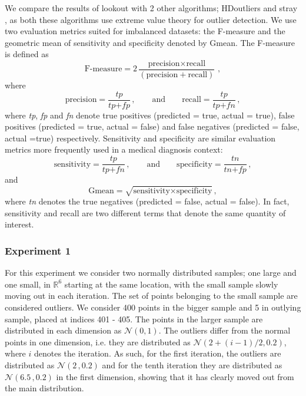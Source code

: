 \documentclass[letter,12pt]{article}
\begin{document}
We compare the results of lookout with 2 other algorithms; HDoutliers \citep{wilkinson2017visualizing} and stray \citep{pridiltal}, as both these algorithms use extreme value theory for outlier detection. We use two evaluation metrics suited for imbalanced datasets: the F-measure and the geometric mean of sensitivity and specificity denoted by Gmean. The F-measure is defined as
\begin{equation}\label{eq:fmeasure}
    \text{F-measure} =  2\frac{\text{precision} \times \text{recall}}{\left( \text{precision} + \text{recall} \right) } \, , 
\end{equation}
where 
\begin{equation}\label{eq:pr}
    \text{precision} =  \frac{ \textit{tp} }{\textit{tp} + \textit{fp}} \, ,  \qquad \text{and} \qquad \text{recall} = \frac{\textit{tp}}{\textit{tp} + \textit{fn}} \, ,
\end{equation}
where \textit{tp}, \textit{fp} and \textit{fn} denote true positives (predicted = true, actual = true), false positives (predicted = true, actual = false) and false negatives (predicted = false, actual =true) respectively. Sensitivity and specificity are similar evaluation metrics more frequently used in a medical diagnosis context: 
\begin{equation}\label{eq:ss}
    \text{sensitivity} =  \frac{ \textit{tp} }{\textit{tp} + \textit{fn}} \, ,  \qquad \text{and} \qquad \text{specificity} = \frac{\textit{tn}}{\textit{tn} + \textit{fp}} \, ,
\end{equation}
and 
\begin{equation}\label{eq:gmean}
    \text{Gmean} =  \sqrt{ \text{sensitivity} \times \text{specificity}} \, , 
\end{equation}
where \textit{tn} denotes the true negatives (predicted = false, actual = false). In fact, sensitivity and recall are two different terms that denote the same quantity of interest. 

\subsubsection{Experiment 1}\label{sec:exp1}
For this experiment we consider two normally distributed samples; one large and one small, in  $\mathbb{R}^6$ starting at the same location, with the small sample slowly moving out in each iteration. The set of points belonging to the small sample are considered outliers. We consider 400 points in the bigger sample and 5 in outlying sample, placed at indices 401 - 405. The points in the larger sample are distributed in each dimension as $\mathscr{N}(0, 1)$. The outliers differ from the normal points in one dimension, i.e. they are distributed as $\mathscr{N}\left(2 + (i-1)/2, 0.2 \right)$, where $i$ denotes the iteration. As such, for the first iteration, the outliers are distributed as $\mathscr{N}\left(2 \, , 0.2 \right)$ and for the tenth iteration they are distributed as $\mathscr{N}\left(6.5 \, , 0.2 \right)$ in the first dimension, showing that it has clearly moved out from the main distribution.
\end{document}
